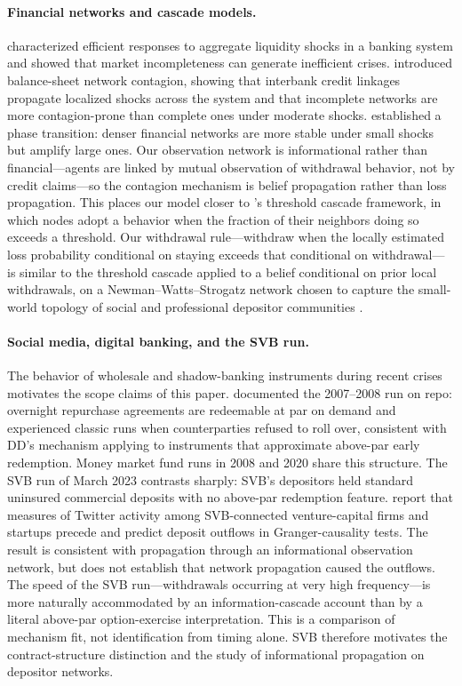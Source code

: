 \documentclass[12pt]{article}\usepackage[]{graphicx}\usepackage[]{xcolor}
\begin{document}
\paragraph{Financial networks and cascade models.}
\citet{allen1998optimal} characterized efficient responses to aggregate liquidity shocks in a banking system and showed that market incompleteness can generate inefficient crises.
\citet{allen2000financial} introduced balance-sheet network contagion, showing that interbank credit linkages propagate localized shocks across the system and that incomplete networks are more contagion-prone than complete ones under moderate shocks.
\citet{acemoglu2015systemic} established a phase transition: denser financial networks are more stable under small shocks but amplify large ones.
Our observation network is informational rather than financial---agents are linked by mutual observation of withdrawal behavior, not by credit claims---so the contagion mechanism is belief propagation rather than loss propagation.
This places our model closer to \citet{watts2002simple}'s threshold cascade framework, in which nodes adopt a behavior when the fraction of their neighbors doing so exceeds a threshold.
Our withdrawal rule---withdraw when the locally estimated loss probability conditional on staying exceeds that conditional on withdrawal--- is similar to the threshold cascade applied to a belief conditional on prior local withdrawals, on a Newman--Watts--Strogatz network chosen to capture the small-world topology of social and professional depositor communities \citep{newman1999renormalization}.

\paragraph{Social media, digital banking, and the SVB run.}
The behavior of wholesale and shadow-banking instruments during recent crises motivates the scope claims of this paper.
\citet{gorton2012securitized} documented the 2007--2008 run on repo: overnight repurchase agreements are redeemable at par on demand and experienced classic runs when counterparties refused to roll over, consistent with DD's mechanism applying to instruments that approximate above-par early redemption.
Money market fund runs in 2008 and 2020 share this structure.
The SVB run of March 2023 contrasts sharply: SVB's depositors held standard uninsured commercial deposits with no above-par redemption feature.
\citet{cookson2023social} report that measures of Twitter activity among SVB-connected venture-capital firms and startups precede and predict deposit outflows in Granger-causality tests.
The result is consistent with propagation through an informational observation network, but does not establish that network propagation caused the outflows.
The speed of the SVB run---withdrawals occurring at very high frequency---is more naturally accommodated by an information-cascade account than by a literal above-par option-exercise interpretation.
This is a comparison of mechanism fit, not identification from timing alone.
SVB therefore motivates the contract-structure distinction and the study of informational propagation on depositor networks.
\end{document}
